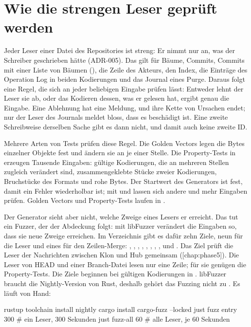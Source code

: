 {\section[sec:strict-readers]{Wie die strengen Leser geprüft werden}

Jeder Leser einer Datei des Repositories ist streng: Er nimmt nur an, was der Schreiber
geschrieben hätte (ADR-005). Das gilt für Bäume, Commits, Commits mit einer Liste von Bäumen
(), die Zeile des Akteurs, den Index, die Einträge des Operation Log in beiden
Kodierungen und das Journal eines Purge. Daraus folgt eine Regel, die sich an jeder beliebigen
Eingabe prüfen lässt: Entweder lehnt der Leser sie ab, oder das Kodieren dessen, was er gelesen
hat, ergibt genau die Eingabe. Eine Ablehnung hat eine Meldung, und ihre Kette von Ursachen endet;
nur der Leser des Journals meldet bloss, dass es beschädigt ist.
Eine zweite Schreibweise derselben Sache gibt es dann nicht, und damit auch keine zweite ID.

Mehrere Arten von Tests prüfen diese Regel. Die Golden Vectors legen die Bytes einzelner Objekte
fest und ändern sie an je einer Stelle. Die Property-Tests in  erzeugen
Tausende Eingaben: gültige Kodierungen, die an mehreren Stellen zugleich verändert sind,
zusammengeklebte Stücke zweier Kodierungen, Bruchstücke des Formats und rohe Bytes. Der
Startwert des Generators ist fest, damit ein Fehler wiederholbar ist; mit
 und  lassen sich andere und mehr
Eingaben prüfen. Golden Vectors und Property-Tests laufen in .

Der Generator sieht aber nicht, welche Zweige eines Lesers er erreicht. Das tut ein Fuzzer,
der der Abdeckung folgt:  mit libFuzzer verändert die Eingaben so, dass sie
neue Zweige erreichen. Im Verzeichnis  gibt es dafür zehn Ziele, neun für die Leser
und eines für den Zeilen-Merge:
, , , , , ,
, ,  und .
Das Ziel  prüft die Leser der Nachrichten zwischen Klon und Hub gemeinsam
([chap:phase5]).
Die Leser von HEAD und einer Branch-Datei lesen nur eine Zeile; für sie genügen die
Property-Tests. Die Ziele beginnen bei gültigen Kodierungen in .
libFuzzer braucht die Nightly-Version von Rust, deshalb gehört das Fuzzing nicht zu
. Es läuft von Hand:

\starttyping
rustup toolchain install nightly
cargo install cargo-fuzz --locked
just fuzz entry 300      # ein Leser, 300 Sekunden
just fuzz-all 60         # alle Leser, je 60 Sekunden
\stoptyping

}
